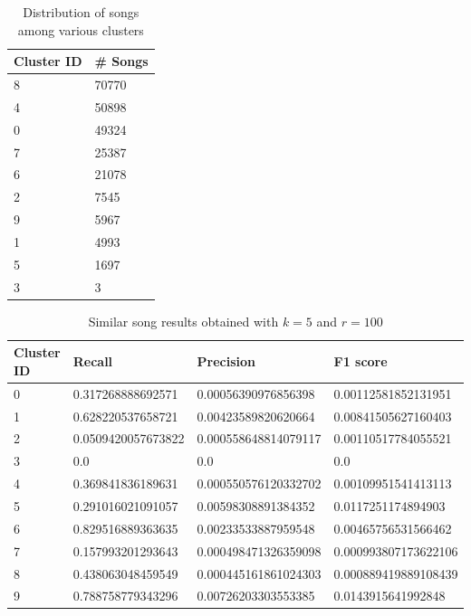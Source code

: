 \documentclass[10pt,a4paper]{scrartcl}
\begin{document}
\begin{table}[h]
\centering
\caption{Distribution of songs among various clusters}
\begin{tabular}{@{}ll@{}}
\toprule
Cluster ID & \# Songs \\ \midrule
8           & 70770      \\
4           & 50898      \\
0           & 49324      \\
7           & 25387      \\
6           & 21078      \\
2           & 7545       \\
9           & 5967       \\
1           & 4993       \\
5           & 1697       \\
3           & 3          \\ \bottomrule
\end{tabular}
\label{tab:song_dis}
\end{table}
  
\begin{table}[h]
\centering
\caption{Similar song results obtained with $k = 5$ and $r = 100$}
\begin{tabular}{@{}llll@{}}
\toprule
Cluster ID & Recall             & Precision            & F1 score             \\ \midrule
0          & 0.317268888692571  & 0.00056390976856398  & 0.00112581852131951  \\
1          & 0.628220537658721  & 0.00423589820620664  & 0.00841505627160403  \\
2          & 0.0509420057673822 & 0.000558648814079117 & 0.00110517784055521  \\
3          & 0.0                   & 0.0                     &  0.0                    \\
4          & 0.369841836189631  & 0.000550576120332702 & 0.00109951541413113  \\
5          & 0.291016021091057  & 0.00598308891384352  & 0.0117251174894903   \\
6          & 0.829516889363635  & 0.00233533887959548  & 0.00465756531566462  \\
7          & 0.157993201293643  & 0.000498471326359098 & 0.000993807173622106 \\
8          & 0.438063048459549  & 0.000445161861024303 & 0.000889419889108439 \\
9          & 0.788758779343296  & 0.00726203303553385  & 0.0143915641992848   \\ \bottomrule
\end{tabular}
\label{tab:res}
\end{table}
\end{document}
